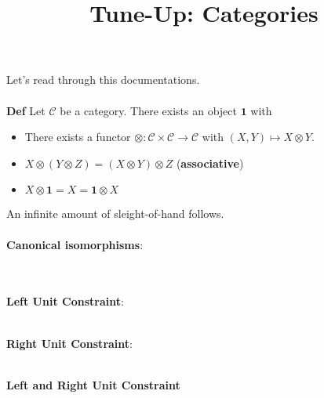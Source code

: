 \documentclass[12pt]{article}
\title{Tune-Up: Categories}
\date{}
\begin{document}
\sffamily

\maketitle

{\fontsize{16pt}{16pt}\selectfont 

\noindent Let's read through this documentations. \\ \\
\textbf{Def} Let $\mathcal{C}$ be a category.  There exists an object $\mathbf{1}$ with
\begin{itemize}
	\item There exists a functor $\otimes : \mathcal{C} \times \mathcal{C} \to \mathcal{C}$ with $(X,Y) \mapsto X \otimes Y$.
	\item $X \otimes (Y \otimes Z) = (X \otimes Y) \otimes Z$ (\textbf{associative})
	\item $X \otimes \mathbf{1} = X = \mathbf{1} \otimes X$
\end{itemize}
An infinite amount of sleight-of-hand follows.  \\ \\
\textbf{Canonical isomorphisms}: \\
 \\ \\
\textbf{Left Unit Constraint}: \\
 \\
\textbf{Right Unit Constraint}: \\
 \\ 
\textbf{Left and Right Unit Constraint} \\

}
\end{document}
